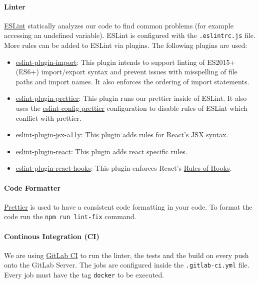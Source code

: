\paragraph{Linter}
\href{https://eslint.org}{ESLint} statically analyzes our code to find common problems (for example accessing an undefined variable). 
ESLint is configured with the \texttt{.eslintrc.js} file. 
More rules can be added to ESLint via plugins. 
The following plugins are used:
\begin{itemize}
    \item \href{https://www.npmjs.com/package/eslint-plugin-import}{eslint-plugin-import}: 
      This plugin intends to support linting of ES2015+ (ES6+) import/export syntax and prevent issues with misspelling of file paths and import names. 
      It also enforces the ordering of import statements.
    \item \href{https://www.npmjs.com/package/eslint-plugin-prettier}{eslint-plugin-prettier}:
      This plugin runs our  prettier inside of ESLint. 
      It also uses the \href{https://www.npmjs.com/package/eslint-config-prettier}{eslint-config-prettier} configuration to disable rules of ESLint which conflict with prettier.
    \item \href{https://www.npmjs.com/package/eslint-plugin-jsx-a11y}{eslint-plugin-jsx-a11y}: This plugin adds rules for \href{https://reactjs.org/docs/introducing-jsx.html}{React's JSX} syntax.
    \item \href{https://www.npmjs.com/package/eslint-plugin-react}{eslint-plugin-react}: This plugin adds react specific rules.
    \item \href{https://www.npmjs.com/package/eslint-plugin-react-hooks}{eslint-plugin-react-hooks}: This plugin enforces React's \href{https://reactjs.org/docs/hooks-rules.html}{Rules of Hooks}.
\end{itemize}

\paragraph{Code Formatter}
\label{sec:code-formatter}
\href{https://prettier.io}{Prettier} is used to have a consistent code formatting in your code. 
To format the code run the \texttt{npm run lint-fix} command.

\paragraph{Continous Integration (CI)}
We are using \href{https://mad-srv.informatik.uni-erlangen.de/help/ci/README.md}{GitLab CI} to run the linter, the tests and the build on every push onto the GitLab Server. 
The jobs are configured inside the \texttt{.gitlab-ci.yml} file. 
Every job must have the tag \texttt{docker} to be executed.

